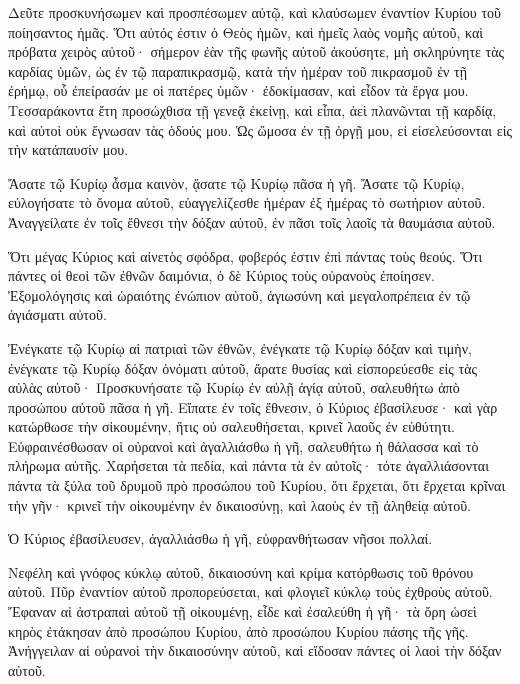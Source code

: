 \begin{spacing}{1.1}
\begin{multicols}{2}
Δεῦτε προσκυνήσωμεν καὶ προσπέσωμεν αὐτῷ, καὶ κλαύσωμεν ἐναντίον Κυρίου τοῦ ποίησαντος ἡμᾶς.
Ὅτι αὐτός ἐστιν ὁ Θεὸς ἡμῶν, καὶ ἡμεῖς λαὸς νομῆς αὐτοῦ, καὶ πρόβατα χειρὸς αὐτοῦ·
σήμερον ἐὰν τῆς φωνῆς αὐτοῦ ἀκούσητε, μὴ σκληρύνητε τὰς καρδίας ὑμῶν, ὡς ἐν τῷ παραπικρασμῷ, κατὰ τὴν ἡμέραν τοῦ πικρασμοῦ ἐν τῇ ἐρήμῳ,
οὗ ἐπείρασάν με οἱ πατέρες ὑμῶν· ἐδοκίμασαν, καὶ εἶδον τὰ ἔργα μου.
Τεσσαράκοντα ἔτη προσώχθισα τῇ γενεᾷ ἐκείνῃ, καὶ εἶπα, ἀεὶ πλανῶνται τῇ καρδίᾳ, καὶ αὐτοὶ οὐκ ἔγνωσαν τὰς ὁδούς μου.
Ὡς ὤμοσα ἐν τῇ ὀργῇ μου, εἰ εἰσελεύσονται εἰς τὴν κατάπαυσίν μου.

Ἄσατε τῷ Κυρίῳ ἆσμα καινὸν, ᾄσατε τῷ Κυρίῳ πᾶσα ἡ γῆ.
Ἄσατε τῷ Κυρίῳ, εὐλογήσατε τὸ ὄνομα αὐτοῦ, εὐαγγελίζεσθε ἡμέραν ἐξ ἡμέρας τὸ σωτήριον αὐτοῦ.
Ἀναγγείλατε ἐν τοῖς ἔθνεσι τὴν δόξαν αὐτοῦ, ἐν πᾶσι τοῖς λαοῖς τὰ θαυμάσια αὐτοῦ.

Ὅτι μέγας Κύριος καὶ αἰνετὸς σφόδρα, φοβερός ἐστιν ἐπὶ πάντας τοὺς θεούς.
Ὅτι πάντες οἱ θεοὶ τῶν ἐθνῶν δαιμόνια, ὁ δὲ Κύριος τοὺς οὐρανοὺς ἐποίησεν.
Ἐξομολόγησις καὶ ὡραιότης ἐνώπιον αὐτοῦ, ἁγιωσύνη καὶ μεγαλοπρέπεια ἐν τῷ ἁγιάσματι αὐτοῦ.

Ἐνέγκατε τῷ Κυρίῳ αἱ πατριαὶ τῶν ἐθνῶν, ἐνέγκατε τῷ Κυρίῳ δόξαν καὶ τιμὴν,
ἐνέγκατε τῷ Κυρίῳ δόξαν ὀνόματι αὐτοῦ, ἄρατε θυσίας καὶ εἰσπορεύεσθε εἰς τὰς αὐλὰς αὐτοῦ·
Προσκυνήσατε τῷ Κυρίῳ ἐν αὐλῇ ἁγίᾳ αὐτοῦ, σαλευθήτω ἀπὸ προσώπου αὐτοῦ πᾶσα ἡ γῆ.
Εἴπατε ἐν τοῖς ἔθνεσιν, ὁ Κύριος ἐβασίλευσε· καὶ γὰρ κατώρθωσε τὴν σἰκουμένην, ἥτις οὐ σαλευθήσεται, κρινεῖ λαοῦς ἐν εὐθύτητι.
Εὐφραινέσθωσαν οἱ οὐρανοὶ καὶ ἀγαλλιάσθω ἡ γῆ, σαλευθήτω ἡ θάλασσα καὶ τὸ πλήρωμα αὐτῆς.
Χαρήσεται τὰ πεδία, καὶ πάντα τὰ ἐν αὐτοῖς· τότε ἀγαλλιάσονται πάντα τὰ ξύλα τοῦ δρυμοῦ
πρὸ προσώπου τοῦ Κυρίου, ὅτι ἔρχεται, ὅτι ἔρχεται κρῖναι τὴν γῆν· κρινεῖ τὴν οἰκουμένην ἐν δικαιοσύνῃ, καὶ λαοὺς ἐν τῇ ἀληθείᾳ αὐτοῦ.

Ὁ Κύριος ἐβασίλευσεν, ἀγαλλιάσθω ἡ γῆ, εὐφρανθήτωσαν νῆσοι πολλαί.

Νεφέλη καὶ γνόφος κύκλῳ αὐτοῦ, δικαιοσύνη καὶ κρίμα κατόρθωσις τοῦ θρόνου αὐτοῦ.
Πῦρ ἐναντίον αὐτοῦ προπορεύσεται, καὶ φλογιεῖ κύκλῳ τοὺς ἐχθροὺς αὐτοῦ.
Ἔφαναν αἱ ἀστραπαὶ αὐτοῦ τῇ οἰκουμένῃ, εἶδε καὶ ἐσαλεύθη ἡ γῆ·
τὰ ὄρη ὡσεὶ κηρὸς ἐτάκησαν ἀπὸ προσώπου Κυρίου, ἀπὸ προσώπου Κυρίου πάσης τῆς γῆς.
Ἀνήγγειλαν αἱ οὐρανοὶ τὴν δικαιοσύνην αὐτοῦ, καὶ εἴδοσαν πάντες οἱ λαοὶ τὴν δόξαν αὐτοῦ.


\end{multicols}
\end{spacing}
